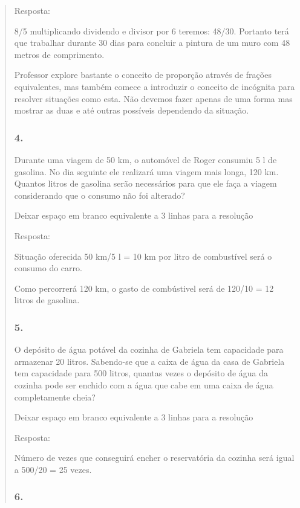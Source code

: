 \begin{enumerate}
\begin{escolha}
\begin{enumerate}
\begin{itemize}
\begin{itemize}
\begin{escolha}
\begin{quote}
\begin{escolha}
{Resposta:

8/5 multiplicando dividendo e divisor por 6 teremos: 48/30. Portanto
terá que trabalhar durante 30 dias para concluir a pintura de um muro
com 48 metros de comprimento.

Professor explore bastante o conceito de proporção através de frações
equivalentes, mas também comece a introduzir o conceito de incógnita
para resolver situações como esta. Não devemos fazer apenas de uma forma
mas mostrar as duas e até outras possíveis dependendo da situação.

\subsubsection{4.}\label{section-120}

Durante uma viagem de 50 km, o automóvel de Roger consumiu 5 l de
gasolina. No dia seguinte ele realizará uma viagem mais longa, 120 km.
Quantos litros de gasolina serão necessários para que ele faça a viagem
considerando que o consumo não foi alterado?

Deixar espaço em branco equivalente a 3 linhas para a resolução

Resposta:

Situação oferecida 50 km/5 l = 10 km por litro de combustível será o
consumo do carro.

Como percorrerá 120 km, o gasto de combústivel será de 120/10 = 12
litros de gasolina.

\subsubsection{5.}\label{section-121}

O depósito de água potável da cozinha de Gabriela tem capacidade para
armazenar 20 litros. Sabendo-se que a caixa de água da casa de Gabriela
tem capacidade para 500 litros, quantas vezes o depósito de água da
cozinha pode ser enchido com a água que cabe em uma caixa de água
completamente cheia?

Deixar espaço em branco equivalente a 3 linhas para a resolução

Resposta:

Número de vezes que conseguirá encher o reservatória da cozinha será
igual a 500/20 = 25 vezes.

\subsubsection{6.}\label{section-122}

}
\end{escolha}
\end{quote}
\end{escolha}
\end{itemize}
\end{itemize}
\end{enumerate}
\end{escolha}
\end{enumerate}
